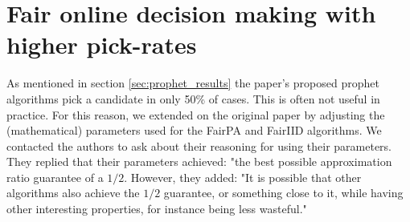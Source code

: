 

\section{Fair online decision making with higher pick-rates}
\label{sec:extension}

As mentioned in section \ref{sec:prophet_results} the paper's proposed prophet algorithms pick a candidate in only 50\% of cases. This is often not useful in practice. For this reason, we extended on the original paper by adjusting the (mathematical) parameters used for the FairPA and FairIID algorithms. We contacted the authors to ask about their reasoning for using their parameters. They replied that their parameters achieved: "the best possible approximation ratio guarantee of a $1/2$. However, they added: "It is possible that other algorithms also achieve the $1/2$ guarantee, or something close to it, while having other interesting properties, for instance being less wasteful."

